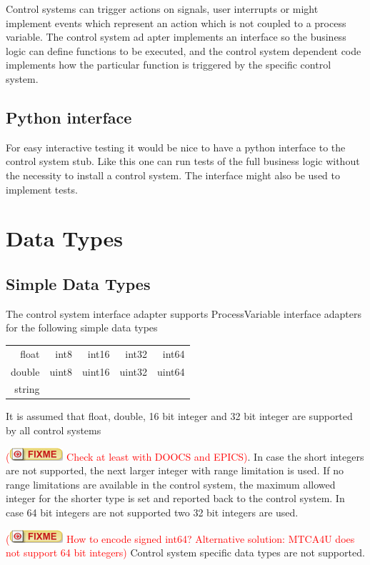 \documentclass[11pt,a4paper]{scrartcl}
\newcounter{nFixmes}
\newcommand{\fixme}[1]{\addtocounter{nFixmes}{1}\textcolor{red}{(\includegraphics[height=2ex]{fixme} #1)}\xspace}
\begin{document}
Control systems can trigger actions on signals, user interrupts or might implement events which represent an action which is not coupled to a process variable. The control system ad apter implements an interface so the business logic can define functions to be executed, and the control system dependent code implements how the particular function is triggered by the specific control system.

\subsection{Python interface}

For easy interactive testing it would be nice to have a python interface to the control system stub. Like this one can run tests of the full business logic without the necessity to install a control system. The interface might also be used to implement tests.

\section{Data Types}

\subsection{Simple Data Types}

The control system interface adapter supports ProcessVariable interface adapters for the following simple data types\\[2ex]
\begin{tabular}{rrrrr}
float & int8 & int16 & int32 & int64\\
double & uint8 & uint16 & uint32 & uint64 \\
string\\[2ex]
\end{tabular}

It is assumed that float, double, 16 bit integer and 32 bit integer are supported by all control systems \fixme{Check at least with DOOCS and EPICS}. In case the short integers are not supported, the next larger integer with range limitation is used. If no range limitations are available in the control system, the maximum allowed integer for the shorter type is set and reported back to the control system. In case 64 bit integers are not supported two 32 bit integers are used. \fixme{How to encode signed int64? Alternative solution: MTCA4U does not support 64 bit integers}
Control system specific data types are not supported.
\end{document}
